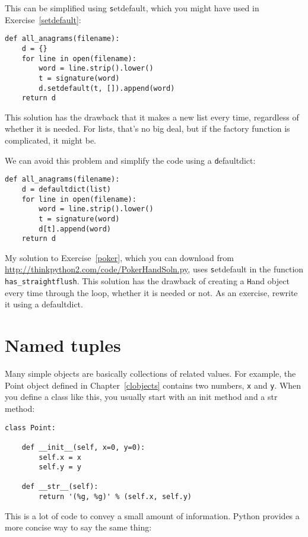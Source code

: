 \documentclass[
DIV=11,
fontsize=13,
twoside,
headinclude=false,
titlepage=firstiscover,
abstract=true,
headsepline=true,
footsepline=true,
chapterprefix=true, %
headings=big,
bibliography=totoc,%
captions=tableheading
]{scrbook}
\theoremstyle{definition}
\begin{document}
This can be simplified using {\texttt setdefault}, which you might
have used in Exercise~\ref{setdefault}:

\begin{lstlisting}
def all_anagrams(filename):
    d = {}
    for line in open(filename):
        word = line.strip().lower()
        t = signature(word)
        d.setdefault(t, []).append(word)
    return d
\end{lstlisting}

This solution has the drawback that it makes a new list
every time, regardless of whether it is needed.  For lists,
that's no big deal, but if the factory
function is complicated, it might be.

We can avoid this problem and 
simplify the code using a {\texttt defaultdict}:

\begin{lstlisting}
def all_anagrams(filename):
    d = defaultdict(list)
    for line in open(filename):
        word = line.strip().lower()
        t = signature(word)
        d[t].append(word)
    return d
\end{lstlisting}

My solution to Exercise~\ref{poker}, which you can download from
\url{http://thinkpython2.com/code/PokerHandSoln.py},
uses {\texttt setdefault} in the function
\verb"has_straightflush".  This solution has the drawback
of creating a {\texttt Hand} object every time through the loop, whether
it is needed or not.  As an exercise, rewrite it using
a defaultdict.


\section{Named tuples}

Many simple objects are basically collections of related values.
For example, the Point object defined in Chapter~\ref{clobjects} contains
two numbers, {\texttt x} and {\texttt y}.  When you define a class like
this, you usually start with an init method and a str method:

\begin{lstlisting}
class Point:

    def __init__(self, x=0, y=0):
        self.x = x
        self.y = y

    def __str__(self):
        return '(%g, %g)' % (self.x, self.y)
\end{lstlisting}

This is a lot of code to convey a small amount of information.
Python provides a more concise way to say the same thing:
\end{document}
